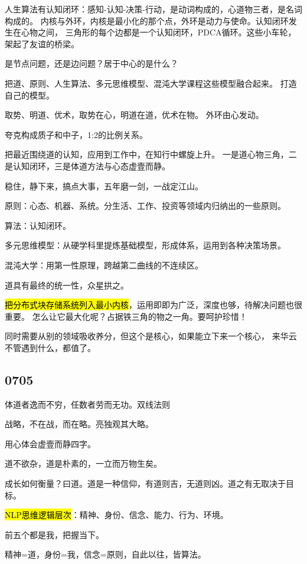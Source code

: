 人生算法有认知闭环：感知-认知-决策-行动，是动词构成的，心道物三者，是名词构成的。
内核与外环，内核是最小化的那个点，外环是动力与使命。认知闭环发生在心物之间，
三角形的每个边都是一个认知闭环，PDCA循环。这些小车轮，架起了友谊的桥梁。

是节点问题，还是边问题？居于中心的是什么？

把道、原则、人生算法、多元思维模型、混沌大学课程这些模型融合起来。
打造自己的模型。

取势、明道、优术，取势在心，明道在道，优术在物。
外环由心发动。

夸克构成质子和中子，1:2的比例关系。

把最近围绕道的认知，应用到工作中，在知行中螺旋上升。
一是道心物三角，二是认知闭环，三是体道方法与心态虚壹而静。

稳住，静下来，搞点大事，五年磨一剑，一战定江山。

原则：心态、机器、系统。分生活、工作、投资等领域内归纳出的一些原则。

算法：认知闭环。

多元思维模型：从硬学科里提炼基础模型，形成体系，运用到各种决策场景。

混沌大学：用第一性原理，跨越第二曲线的不连续区。

道具有最终的统一性，众星拱之。

\hl{把分布式块存储系统列入最小内核}，运用即即为广泛，深度也够，待解决问题也很重要。
怎么让它最大化呢？占据铁三角的物之一角。要呵护珍惜！

同时需要从别的领域吸收养分，但这个是核心，如果能立下来一个核心，
来华云不管遇到什么，都值了。

\subsection{0705}

体道者逸而不穷，任数者劳而无功。双线法则

战略，不在战，而在略。亮独观其大略。

用心体会虚壹而静四字。

道不欲杂，道是朴素的，一立而万物生矣。


成长如何衡量？曰道。道是一种信仰，有道则吉，无道则凶。道之有无取决于目标。

\hl{NLP思维逻辑层次}：精神、身份、信念、能力、行为、环境。

前五个都是我，把握当下。

精神=道，身份=我，信念=原则，自此以往，皆算法。

